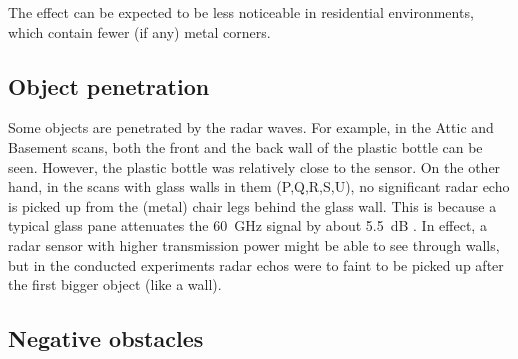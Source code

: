 The effect can be expected to be less noticeable in residential environments, which contain fewer (if any) metal corners.

\subsection{Object penetration}\label{object-penetration}

Some objects are penetrated by the radar waves. For example, in the
Attic and Basement scans, both the front and the back wall of the
plastic bottle can be seen. However, the plastic bottle was relatively
close to the sensor. On the other hand, in the scans with glass walls in
them (P,Q,R,S,U), no significant radar echo is picked up from the
(metal) chair legs behind the glass wall. This is because a typical
glass pane attenuates the \SI{60}{GHz} signal by about \SI{5.5}{dB} \cite{Lu2014}. In
effect, a radar sensor with higher transmission power might be able to
see through walls, but in the conducted experiments radar echos were to
faint to be picked up after the first bigger object (like a wall).

\subsection{Negative obstacles}\label{negative-obstacles}

